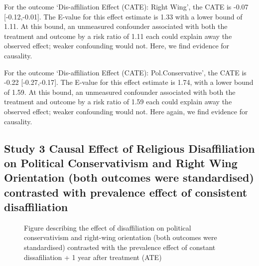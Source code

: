 \documentclass[
  singlecolumn]{article}
\begin{document}
For the outcome `Dis-affiliation Effect (CATE): Right Wing', the CATE is
-0.07 {[}-0.12,-0.01{]}. The E-value for this effect estimate is 1.33
with a lower bound of 1.11. At this bound, an unmeasured confounder
associated with both the treatment and outcome by a risk ratio of 1.11
each could explain away the observed effect; weaker confounding would
not. Here, we find evidence for causality.

For the outcome `Dis-affiliation Effect (CATE): Pol.Conservative', the
CATE is -0.22 {[}-0.27,-0.17{]}. The E-value for this effect estimate is
1.74, with a lower bound of 1.59. At this bound, an unmeasured
confounder associated with both the treatment and outcome by a risk
ratio of 1.59 each could explain away the observed effect; weaker
confounding would not. Here again, we find evidence for causality.

\subsection{Study 3 Causal Effect of Religious Disaffiliation on
Political Conservativism and Right Wing Orientation (both outcomes were
standardised) contrasted with prevalence effect of consistent
disaffiliation}\label{study-3-causal-effect-of-religious-disaffiliation-on-political-conservativism-and-right-wing-orientation-both-outcomes-were-standardised-contrasted-with-prevalence-effect-of-consistent-disaffiliation}

\begin{figure}


\caption{\label{fig-contrast}Figure describing the effect of
disaffiliation on political conservativism and right-wing orientation
(both outcomes were standardised) contrasted with the prevalence effect
of constant dissafiliation + 1 year after treatment (ATE)}

\end{figure}%
\end{document}
